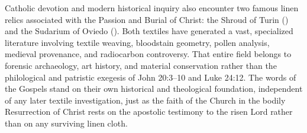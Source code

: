 Catholic devotion and modern historical inquiry also encounter two famous linen relics associated with the Passion and Burial of Christ: the Shroud of Turin () and the Sudarium of Oviedo (). Both textiles have generated a vast, specialized literature involving textile weaving, bloodstain geometry, pollen analysis, medieval provenance, and radiocarbon controversy. That entire field belongs to forensic archaeology, art history, and material conservation rather than the philological and patristic exegesis of John 20:3--10 and Luke 24:12. The words of the Gospels stand on their own historical and theological foundation, independent of any later textile investigation, just as the faith of the Church in the bodily Resurrection of Christ rests on the apostolic testimony to the risen Lord rather than on any surviving linen cloth.
